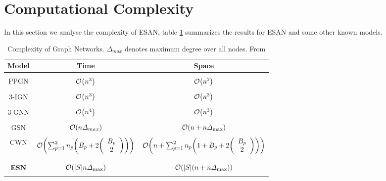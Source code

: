 \documentclass[11pt, dvipsnames, DIV=12]{scrreprt}
\let\originalleft\left
\let\originalright\right
\renewcommand{\left}{\mathopen{}\mathclose\bgroup\originalleft}
\renewcommand{\right}{\aftergroup\egroup\originalright}
\theoremstyle{definition}
\begin{document}
\section{Computational Complexity}In this section we analyse the complexity of ESAN, table \ref{tab:complexity_analysis} summarizes the results for ESAN and some other known models.\begin{table}[h!]
    \centering
    \begin{tabular}{c | c c}
    \hline
    Model & Time & Space \\
    \hline\\
    PPGN & $\mathcal{O}\left(n^3\right)$ & $\mathcal{O}\left(n^2\right)$\\\\
    3-IGN & $\mathcal{O}\left(n^3\right)$ & $\mathcal{O}\left(n^3\right)$\\\\
    3-GNN & $\mathcal{O}\left(n^4\right)$ & $\mathcal{O}\left(n^3\right)$\\\\
    GSN & $\mathcal{O}\left(n\Delta_{max}\right)$ & $\mathcal{O}\left(n+n \Delta_{\max }\right)$\\\\
    CWN & $\mathcal{O}\left(\sum_{p=1}^2 n_p\left(B_p+2\left(\begin{array}{c}B_p \\2\end{array}\right)\right)\right)$ & $\mathcal{O}\left(n+ \sum_{p=1}^2 n_p\left(1+B_p+2\left(\begin{array}{c}B_p \\2\end{array}\right)\right)\right)$\\\\
    \hline\\
    \textbf{ESN} & $\mathcal{O}\left(|S| n \Delta_{\max }\right)$ & $\mathcal{O}\left(|S|\left(n+n \Delta_{\max }\right)\right)$\\\\
    \hline
    \end{tabular}
    \caption{Complexity of Graph Networks. $\Delta_{max}$ denotes maximum degree over all nodes. From \cite{beatrice_esan_2021}}
    \label{tab:complexity_analysis}
\end{table}
\end{document}
